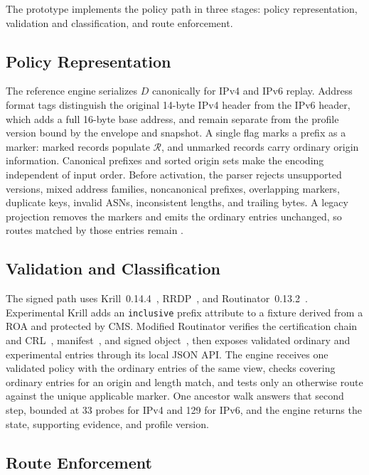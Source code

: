 \label{sec:implementation}

The prototype implements the policy path in three stages: policy representation, validation and classification, and route enforcement.

\subsection{Policy Representation}
\label{sec:impl-representation}

The reference engine serializes $D$ canonically for IPv4 and IPv6 replay. Address format tags distinguish the original 14-byte IPv4 header from the IPv6 header, which adds a full 16-byte base address, and remain separate from the profile version bound by the envelope and snapshot. A single flag marks a prefix as a marker: marked records populate $\mathcal{R}$, and unmarked records carry ordinary origin information. Canonical prefixes and sorted origin sets make the encoding independent of input order. Before activation, the parser rejects unsupported versions, mixed address families, noncanonical prefixes, overlapping markers, duplicate keys, invalid ASNs, inconsistent lengths, and trailing bytes. A legacy projection removes the markers and emits the ordinary entries unchanged, so routes matched by those entries remain \explicit{}.

\subsection{Validation and Classification}
\label{sec:impl-engine}

The signed path uses Krill~0.14.4~\cite{krill}, RRDP~\cite{rfc8182}, and Routinator~0.13.2~\cite{routinator}. Experimental Krill adds an \texttt{inclusive} prefix attribute to a fixture derived from a ROA and protected by CMS. Modified Routinator verifies the certification chain and CRL~\cite{rfc6487}, manifest~\cite{rfc9286}, and signed object~\cite{rfc6488}, then exposes validated ordinary and experimental entries through its local JSON API. The engine receives one validated policy with the ordinary entries of the same view, checks covering ordinary entries for an origin and length match, and tests only an otherwise \invalid{} route against the unique applicable marker. One ancestor walk answers that second step, bounded at 33 probes for IPv4 and 129 for IPv6, and the engine returns the state, supporting evidence, and profile version.

\subsection{Route Enforcement}
\label{sec:impl-enforcement}


